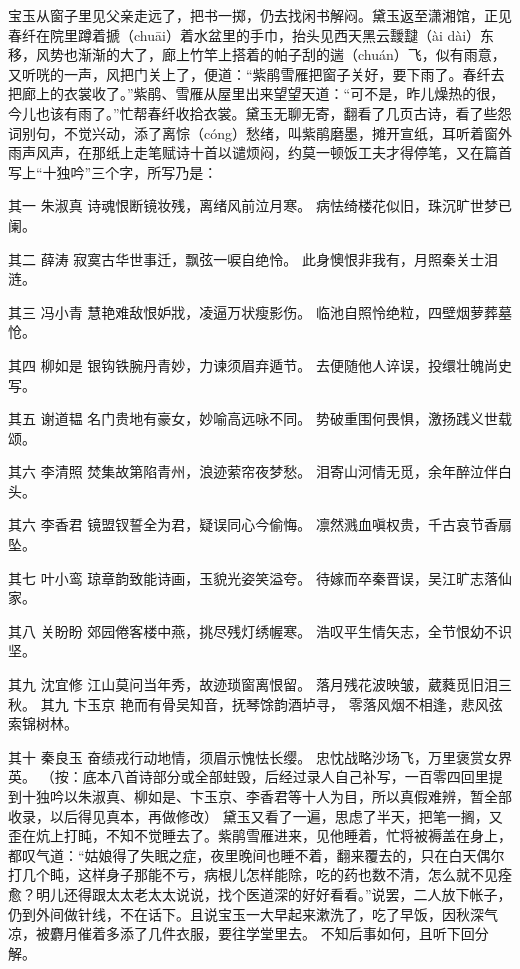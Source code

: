 \documentclass[12pt,oneside]{book}
\begin{document}
宝玉从窗子里见父亲走远了，把书一掷，仍去找闲书解闷。黛玉返至潇湘馆，正见春纤在院里蹲着搋（chuāi）着水盆里的手巾，抬头见西天黑云靉靆（ài dài）东移，风势也渐渐的大了，廊上竹竿上搭着的帕子刮的遄（chuán）飞，似有雨意，又听咣的一声，风把门关上了，便道：“紫鹃雪雁把窗子关好，要下雨了。春纤去把廊上的衣裳收了。”紫鹃、雪雁从屋里出来望望天道：“可不是，昨儿燥热的很，今儿也该有雨了。”忙帮春纤收拾衣裳。黛玉无聊无寄，翻看了几页古诗，看了些怨词别句，不觉兴动，添了离悰（cóng）愁绪，叫紫鹃磨墨，摊开宣纸，耳听着窗外雨声风声，在那纸上走笔赋诗十首以谴烦闷，约莫一顿饭工夫才得停笔，又在篇首写上“十独吟”三个字，所写乃是：

其一 朱淑真
诗魂恨断镜妆残，离绪风前泣月寒。
病怯绮楼花似旧，珠沉旷世梦已阑。

其二 薛涛
寂寞古华世事迁，飘弦一唳自绝怜。
此身懊恨非我有，月照秦关士泪涟。

其三 冯小青
慧艳难敌恨妒戕，凌逼万状瘦影伤。
临池自照怜绝粒，四壁烟萝葬墓怆。

其四 柳如是
银钩铁腕丹青妙，力谏须眉弃遁节。
去便随他人谇误，投缳壮魄尚史写。

其五 谢道韫
名门贵地有豪女，妙喻高远咏不同。
势破重围何畏惧，激扬践义世载颂。

其六 李清照
焚集故第陷青州，浪迹萦帘夜梦愁。
泪寄山河情无觅，余年醉泣伴白头。

其六  李香君 
镜盟钗誓全为君，疑误同心今偷悔。
凛然溅血嗔权贵，千古哀节香扇坠。

其七 叶小鸾
琼章韵致能诗画，玉貌光姿笑溢夸。
待嫁而卒秦晋误，吴江旷志落仙家。

其八 关盼盼
郊园倦客楼中燕，挑尽残灯绣幄寒。
浩叹平生情矢志，全节恨幼不识坚。

其九 沈宜修
江山莫问当年秀，故迹琐窗离恨留。
落月残花波映皱，葳蕤觅旧泪三秋。
其九 卞玉京
艳而有骨吴知音，抚琴馀韵酒垆寻，
零落风烟不相逢，悲风弦索锦树林。

其十 秦良玉
奋绩戎行动地情，须眉示愧怯长缨。
忠忱战略沙场飞，万里褒赏女界英。
（按：底本八首诗部分或全部蛀毁，后经过录人自己补写，一百零四回里提到十独吟以朱淑真、柳如是、卞玉京、李香君等十人为目，所以真假难辨，暂全部收录，以后得见真本，再做修改）
黛玉又看了一遍，思虑了半天，把笔一搁，又歪在炕上打盹，不知不觉睡去了。紫鹃雪雁进来，见他睡着，忙将被褥盖在身上，都叹气道：“姑娘得了失眠之症，夜里晚间也睡不着，翻来覆去的，只在白天偶尔打几个盹，这样身子那能不亏，病根儿怎样能除，吃的药也数不清，怎么就不见痊愈？明儿还得跟太太老太太说说，找个医道深的好好看看。”说罢，二人放下帐子，仍到外间做针线，不在话下。且说宝玉一大早起来漱洗了，吃了早饭，因秋深气凉，被麝月催着多添了几件衣服，要往学堂里去。
不知后事如何，且听下回分解。
 
\end{document}
